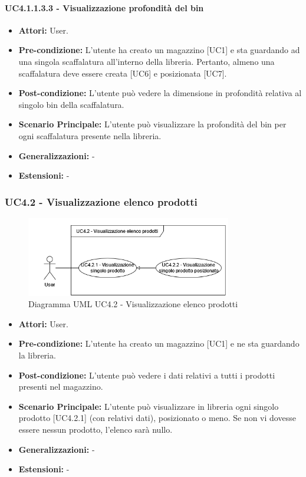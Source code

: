 \paragraph{UC4.1.1.3.3 - Visualizzazione profondità del bin}
\begin{itemize}
    \item \textbf{Attori:} User.
    \item \textbf{Pre-condizione:} L'utente ha creato un magazzino [UC1] e sta guardando ad una singola scaffalatura all'interno della libreria. Pertanto, almeno una scaffalatura deve essere creata [UC6] e posizionata [UC7].
    \item \textbf{Post-condizione:} L'utente può vedere la dimensione in profondità relativa al singolo bin della scaffalatura.
    \item \textbf{Scenario Principale:} L'utente può visualizzare la profondità del bin per ogni scaffalatura presente nella libreria.
    \item \textbf{Generalizzazioni:} -
    \item \textbf{Estensioni:} -
\end{itemize}


\subsubsection{UC4.2 - Visualizzazione elenco prodotti}
\begin{figure}[H]
  \centering
  \includegraphics[width=0.8\textwidth]{UC_diagrams_1-10/UC4.2.drawio.png}
   \caption{Diagramma UML UC4.2 - Visualizzazione elenco prodotti}
\end{figure}
\begin{itemize}
    \item \textbf{Attori:} User.
    \item \textbf{Pre-condizione:}  L'utente ha creato un magazzino [UC1] e ne sta guardando la libreria.
    \item \textbf{Post-condizione:} L'utente può vedere i dati relativi a tutti i prodotti presenti nel magazzino.
    \item \textbf{Scenario Principale:} L'utente può visualizzare in libreria ogni singolo prodotto [UC4.2.1] (con relativi dati), posizionato o meno. Se non vi dovesse essere nessun prodotto, l'elenco sarà nullo.
    \item \textbf{Generalizzazioni:} -
    \item \textbf{Estensioni:} -
\end{itemize}



